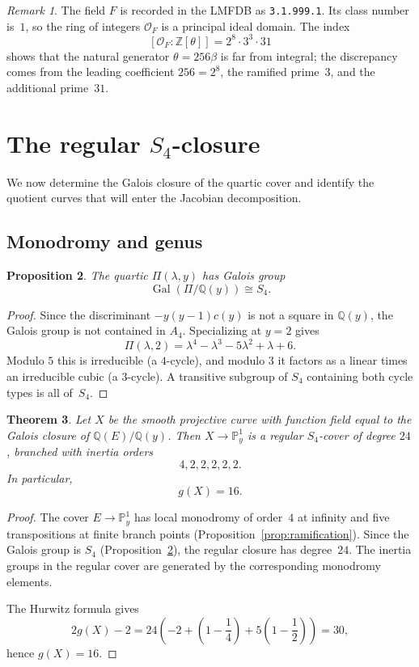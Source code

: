 \documentclass[11pt,letterpaper]{article}
\theoremstyle{plain}
\newtheorem{theorem}{Theorem}[section]
\newtheorem{proposition}[theorem]{Proposition}
\theoremstyle{remark}
\newtheorem{remark}[theorem]{Remark}
\newcommand{\QQ}{\mathbb{Q}}
\newcommand{\ZZ}{\mathbb{Z}}
\newcommand{\PP}{\mathbb{P}}
\newcommand{\Gal}{\operatorname{Gal}}
\begin{document}
\begin{remark}\label{rem:cubic-field}
The field \(F\) is recorded in the LMFDB \cite{LMFDB} as \texttt{3.1.999.1}. Its class number is~\(1\), so the ring of integers \(\mathcal O_F\) is a principal ideal domain. The index
\[
[\mathcal O_F:\ZZ[\theta]]=2^8\cdot 3^3\cdot 31
\]
shows that the natural generator \(\theta=256\beta\) is far from integral; the discrepancy comes from the leading coefficient \(256=2^8\), the ramified prime~\(3\), and the additional prime~\(31\).
\end{remark}

\section{The regular \texorpdfstring{$S_4$}{S4}-closure}

We now determine the Galois closure of the quartic cover and identify the quotient curves that will enter the Jacobian decomposition.

\subsection{Monodromy and genus}

\begin{proposition}\label{prop:s4}
The quartic \(\Pi(\lambda,y)\) has Galois group
\[
\Gal(\Pi/\QQ(y))\cong S_4.
\]
\end{proposition}

\begin{proof}
Since the discriminant \(-y(y-1)c(y)\) is not a square in \(\QQ(y)\), the Galois group is not contained in \(A_4\). Specializing at \(y=2\) gives
\[
\Pi(\lambda,2)=\lambda^4-\lambda^3-5\lambda^2+\lambda+6.
\]
Modulo \(5\) this is irreducible (a \(4\)-cycle), and modulo \(3\) it factors as a linear times an irreducible cubic (a \(3\)-cycle). A transitive subgroup of \(S_4\) containing both cycle types is all of~\(S_4\).
\end{proof}

\begin{theorem}\label{thm:closure}
Let \(X\) be the smooth projective curve with function field equal to the Galois closure of \(\QQ(E)/\QQ(y)\).
Then \(X\to\PP^1_y\) is a regular \(S_4\)-cover of degree \(24\), branched with inertia orders
\[
4,2,2,2,2,2.
\]
In particular,
\[
g(X)=16.
\]
\end{theorem}

\begin{proof}
The cover \(E\to\PP^1_y\) has local monodromy of order~\(4\) at infinity and five transpositions at finite branch points (Proposition~\ref{prop:ramification}). Since the Galois group is \(S_4\) (Proposition~\ref{prop:s4}), the regular closure has degree~\(24\). The inertia groups in the regular cover are generated by the corresponding monodromy elements.

The Hurwitz formula gives
\[
2g(X)-2
=24\left(-2+\left(1-\frac14\right)+5\left(1-\frac12\right)\right)
=30,
\]
hence \(g(X)=16\).
\end{proof}
\end{document}
